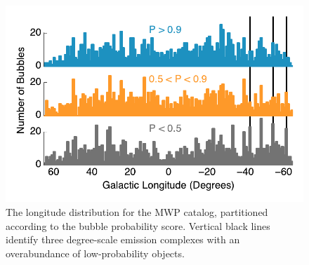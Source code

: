 \begin{figure}[h!]
\includegraphics{dist_lon}
\caption{The longitude distribution for the MWP catalog, partitioned according to the bubble probability score.
Vertical black lines identify three degree-scale emission complexes with an overabundance of low-probability objects.}
\label{fig:dist_lon}
\end{figure}



